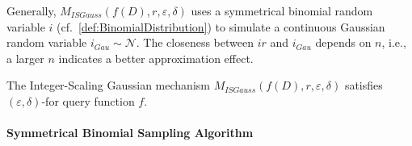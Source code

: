 Generally, $M_{ISGauss}\left(f\left(D\right),r,\varepsilon,\delta\right)$ uses a symmetrical binomial random variable $i $ (cf.~\autoref{def:BinomialDistribution}) to simulate a continuous Gaussian random variable $i_{Gau}\sim \mathcal{N}  $. The closeness between $ir$ and $i_{Gau}$ depends on $n$, i.e., a larger $n$ indicates a better approximation effect.


\begin{theorem}
    The Integer-Scaling Gaussian mechanism $M_{ISGauss}\left(f\left(D\right),r,\varepsilon,\delta\right)$ satisfies $ \left(\varepsilon,\delta\right) $-\differentialprivacy for query function $f$.
\end{theorem}



\paragraph{Symmetrical Binomial Sampling Algorithm}
\label{para:SymmetricalBinomialSamplingAlgorithm}

